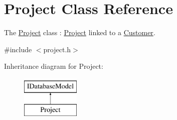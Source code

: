 \hypertarget{classProject}{\section{Project Class Reference}
\label{classProject}
}


The \hyperlink{classProject}{Project} class \+: \hyperlink{classProject}{Project} linked to a \hyperlink{classCustomer}{Customer}.  




{\ttfamily \#include $<$project.\+h$>$}

Inheritance diagram for Project\+:\begin{figure}[H]
\begin{center}
\leavevmode
\includegraphics[height=2.000000cm]{db/d91/classProject}
\end{center}
\end{figure}
